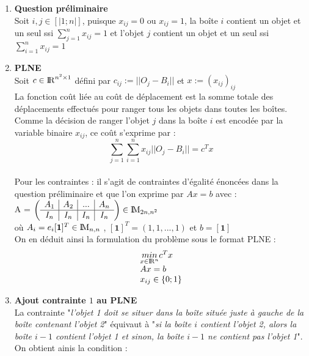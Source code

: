 \documentclass[a4paper]{article}
\begin{document}
\begin{enumerate}
\item \textbf{Question préliminaire}
\vspace{0.1cm}
\\ Soit $i,j \in [|1;n|]$, puisque $x_{ij} = 0$ ou $x_{ij} = 1$, la boîte $i$ contient un objet et un seul ssi $\sum_{j = 1}^{n}x_{ij} = 1$ et l'objet $j$ contient un objet et un seul ssi $\sum_{i = 1}^{n}x_{ij} = 1$

\item \textbf{PLNE}
\vspace{0.1cm}
\\ Soit $c \in {\rm I\!R}^{n^{2} \times 1}$ défini par $c_{ij} := ||O_j - B_i|| $ et $x := (x_{ij})_{ij}$
\vspace{0.1cm}
\\ La fonction coût liée au coût de déplacement est la somme totale des déplacements effectués pour ranger tous les objets dans toutes les boîtes. Comme la décision de ranger l'objet $j$ dans la boîte $i$ est encodée par la variable binaire $x_{ij}$, ce coût s'exprime par : 
\[ \sum_{j = 1}^{n} \sum_{i = 1}^{n} x_{ij}||O_j - B_i|| = c^T x \]
\vspace{0.2cm}
\\ Pour les contraintes : il s'agit de contraintes d'égalité énoncées dans la question préliminaire et que l'on exprime par $Ax = b$ avec :
\\ A = $\left (\begin{array}{c|c|c|c}
A_1 & A_2 & ... & A_n \\
\hline
I_n & I_n & I_n & I_n \\
\end{array}\right) \in {\rm I\!M}_{2n, n^{2}}$ 
\\ où $A_i = e_i [\textbf{1}]^T \in {\rm I\!M}_{n, n}$ , $[\textbf{1}]^T = (1,1,...,1) $ et $ b = [\textbf{1}]$
\vspace{0.2cm}
\\ On en déduit ainsi la formulation du problème sous le format PLNE : 
$$\begin{array}{ll}
        \underset{x \in {\rm I\!R}^{n}}{min}  c^T x \\
        Ax = b \\
        x_{ij} \in \left\{ 0 ; 1\right\}   
\end{array}$$
\item \textbf{Ajout contrainte $1$ au PLNE}
\vspace{0.1cm}
\\La contrainte "\textit{l'objet 1 doit se situer dans la boîte située juste à gauche de la boîte contenant l'objet 2}" équivaut à "\textit{si la boîte $i$ contient l'objet 2, alors la boîte $i-1$ contient l'objet 1 et sinon, la boîte $i-1$ ne contient pas l'objet 1}". On obtient ainis la condition : 

\end{enumerate}
\end{document}

